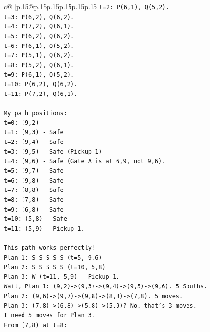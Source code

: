 \documentclass{article}
\begin{document}
{\begin{supertabular}{c@{$\;$}|p{.15\linewidth}@{}p{.15\linewidth}p{.15\linewidth}p{.15\linewidth}p{.15\linewidth}p{.15\linewidth}}
{{{\texttt{t=2: P(6,1), Q(5,2).} \\
\texttt{t=3: P(6,2), Q(6,2).} \\
\texttt{t=4: P(7,2), Q(6,1).} \\
\texttt{t=5: P(6,2), Q(6,2).} \\
\texttt{t=6: P(6,1), Q(5,2).} \\
\texttt{t=7: P(5,1), Q(6,2).} \\
\texttt{t=8: P(5,2), Q(6,1).} \\
\texttt{t=9: P(6,1), Q(5,2).} \\
\texttt{t=10: P(6,2), Q(6,2).} \\
\texttt{t=11: P(7,2), Q(6,1).} \\
\\ 
\texttt{My path positions:} \\
\texttt{t=0: (9,2)} \\
\texttt{t=1: (9,3) {-} Safe} \\
\texttt{t=2: (9,4) {-} Safe} \\
\texttt{t=3: (9,5) {-} Safe (Pickup 1)} \\
\texttt{t=4: (9,6) {-} Safe (Gate A is at 6,9, not 9,6).} \\
\texttt{t=5: (9,7) {-} Safe} \\
\texttt{t=6: (9,8) {-} Safe} \\
\texttt{t=7: (8,8) {-} Safe} \\
\texttt{t=8: (7,8) {-} Safe} \\
\texttt{t=9: (6,8) {-} Safe} \\
\texttt{t=10: (5,8) {-} Safe} \\
\texttt{t=11: (5,9) {-} Pickup 1.} \\
\\ 
\texttt{This path works perfectly!} \\
\texttt{Plan 1: S S S S S (t=5, 9,6)} \\
\texttt{Plan 2: S S S S S (t=10, 5,8)} \\
\texttt{Plan 3: W (t=11, 5,9) {-} Pickup 1.} \\
\texttt{Wait, Plan 1: (9,2){-}>(9,3){-}>(9,4){-}>(9,5){-}>(9,6). 5 Souths.} \\
\texttt{Plan 2: (9,6){-}>(9,7){-}>(9,8){-}>(8,8){-}>(7,8). 5 moves.} \\
\texttt{Plan 3: (7,8){-}>(6,8){-}>(5,8){-}>(5,9)? No, that's 3 moves.} \\
\texttt{I need 5 moves for Plan 3.} \\
\texttt{From (7,8) at t=8:} \\
}}}
\end{supertabular}}
\end{document}

